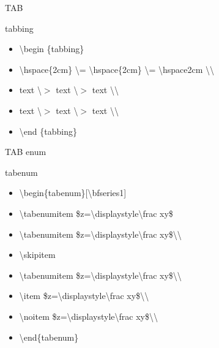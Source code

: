 \documentclass[ aspectratio=149,  14pt,blue,xcolor=pdftex,dvipsnames,table,handout,notes]{beamer}
\begin{document}
		\begin{frame}[t]{TAB}

		\begin{block}{tabbing}
		\begin{itemize}
		\item[]	\textbackslash begin \{tabbing\}
		\item[]	\textbackslash hspace\{2cm\}	\textbackslash = 
				\textbackslash hspace\{2cm\}	\textbackslash = 
				\textbackslash hspace{2cm}	
				\textbackslash \textbackslash 

		\item[]	text	\textbackslash $>$
				text	\textbackslash $>$
				text	\textbackslash\textbackslash

		\item[]	text	\textbackslash $>$
				text	\textbackslash $>$
				text	\textbackslash\textbackslash

		\item[]	\textbackslash end \{tabbing\}
		\end{itemize}

		\end{block}


		\end{frame}


		\begin{frame}[t]{TAB enum}

		\begin{block}{tabenum}
		\begin{itemize}
		\item[]	\textbackslash begin\{tabenum\}[\textbackslash bfseries1]
		\item[]	\textbackslash tabenumitem 		\$z=\textbackslash displaystyle\textbackslash frac xy\$
		\item[]	\textbackslash tabenumitem 		\$z=\textbackslash displaystyle\textbackslash frac xy\$\textbackslash\textbackslash 
		\item[]	\textbackslash skipitem
		\item[]	\textbackslash tabenumitem 		\$z=\textbackslash displaystyle\textbackslash frac xy\$\textbackslash\textbackslash 
		\item[]	\textbackslash item 			\$z=\textbackslash displaystyle\textbackslash frac xy\$\textbackslash\textbackslash 
		\item[]	\textbackslash noitem 			\$z=\textbackslash displaystyle\textbackslash frac xy\$\textbackslash\textbackslash 
		\item[]	\textbackslash end\{tabenum\}
		\end{itemize}
		\end{block}

		\end{frame}
\end{document}
